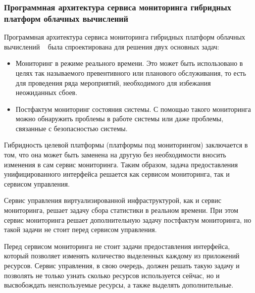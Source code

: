 \subsubsection*{Программная архитектура сервиса мониторинга гибридных платформ облачных вычислений}
Программная архитектура сервиса мониторинга гибридных платформ облачных вычислений ~\cite{hybrid-cloud-computing-monitoring-software-architecture} была спроектирована для решения двух основных задач:
\begin{itemize} 
    \item Мониторинг в режиме реального времени. Это может быть использовано в целях так называемого превентивного или планового обслуживания, то есть для проведения ряда мероприятий, необходимого для избежания неожиданных сбоев.
    \item Постфактум мониторинг состояния системы. С помощью такого мониторинга можно обнаружить проблемы в работе системы или даже проблемы, связанные с безопасностью системы.
\end{itemize} 
Гибридность целевой платформы (платформы под мониторингом) заключается в том, что она может быть заменена на другую без необходимости вносить изменения в сам сервис мониторинга. 
Таким образом, задача предоставления унифицированного интерфейса решается как сервисом мониторинга, так и сервисом управления.

Сервис управления виртуализированной инфраструктурой, как и сервис мониторинга, решает задачу сбора статистики в реальном времени. 
При этом сервис мониторинга решает дополнительную задачу постфактум мониторинга, но такой задачи не стоит перед сервисом управления.

Перед сервисом мониторинга не стоит задачи предоставления интерфейса, который позволяет изменять количество выделенных каждому из приложений ресурсов. 
Сервис управления, в свою очередь, должен решать такую задачу и позволять не только узнать сколько ресурсов используется сейчас, но и высвобождать неиспользуемые ресурсы, а также выделять дополнительные.